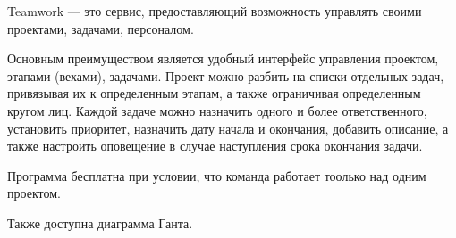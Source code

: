 Teamwork --- это сервис, предоставляющий возможность управлять своими проектами, задачами, персоналом.

Основным преимуществом является удобный интерфейс управления проектом, этапами (вехами), задачами. 
Проект можно разбить на списки отдельных задач, привязывая их к определенным этапам, а также ограничивая определенным кругом лиц. 
Каждой задаче можно назначить одного и более ответственного, установить приоритет, назначить дату начала и окончания, добавить описание, а также настроить оповещение в случае наступления срока окончания задачи.

Программа бесплатна при условии, что команда работает тоолько над одним проектом.

Также доступна диаграмма Ганта.